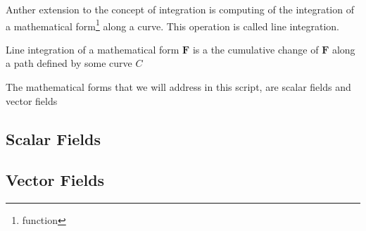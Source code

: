 \documentclass[../../main.tex]{subfiles}
\begin{document}
	
	\par Anther extension to the concept of integration is computing of the integration of a mathematical form\footnote{function} along a curve. This operation is called line integration.
	\begin{definition}
			Line integration of a mathematical form $\mathbf{F}$ is a the cumulative change of $\mathbf{F}$ along a path defined by some curve $C$ 
	\end{definition}
	
	\par The mathematical forms that we will address in this script, are scalar fields and  vector fields 

	\subsection{Scalar Fields}
	\label{sec: scalar fields}
	



	\subsection{Vector Fields}
	\label{sec: vector fields}
		
	
\end{document}
